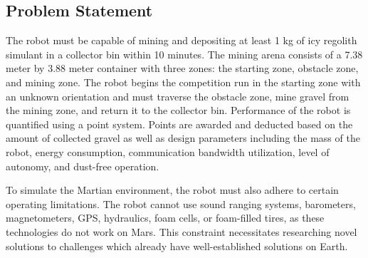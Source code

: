 \documentclass[class=article, crop=false]{standalone}
\begin{document}
	\subsection{Problem Statement}
	\label{subsec:problem_statement}
	The robot must be capable of mining and depositing at least 1 kg of icy regolith simulant in a collector bin within 10 minutes. The mining arena consists of a 7.38 meter by 3.88 meter container with three zones: the starting zone, obstacle zone, and mining zone. The robot begins the competition run in the starting zone with an unknown orientation and must traverse the obstacle zone, mine gravel from the mining zone, and return it to the collector bin. Performance of the robot is quantified using a point system. Points are awarded and deducted based on the amount of collected gravel as well as design parameters including  the mass of the robot, energy consumption, communication bandwidth utilization, level of autonomy, and dust-free operation. 
	
	
	To simulate the Martian environment, the robot must also adhere to certain operating limitations. The robot cannot use sound ranging systems, barometers, magnetometers, GPS, hydraulics, foam cells, or foam-filled tires, as these technologies do not work on Mars. This constraint necessitates researching novel solutions to challenges which already have well-established solutions on Earth.




	
\end{document}
